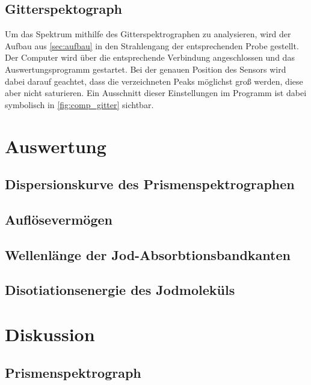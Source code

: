 \documentclass[12pt,english,ngerman]{scrartcl}
\begin{document}
\subsection{Gitterspektograph}

Um das Spektrum mithilfe des Gitterspektrographen zu analysieren, wird der Aufbau aus \autoref{sec:aufbau} in den Strahlengang
der entsprechenden Probe gestellt. Der Computer wird über die entsprechende Verbindung angeschlossen und das 
Auswertungsprogramm gestartet. Bei der genauen Position des Sensors wird dabei darauf geachtet, dass die verzeichneten
Peaks möglichst groß werden, diese aber nicht saturieren. Ein Ausschnitt dieser Einstellungen im Programm ist dabei symbolisch 
in \autoref{fig:comp_gitter} sichtbar.



\section{Auswertung}\label{sec:auswertung}


\subsection{Dispersionskurve des Prismenspektrographen}


\subsection{Auflösevermögen}


\subsection{Wellenlänge der Jod-Absorbtionsbandkanten}


\subsection{Disotiationsenergie des Jodmoleküls}


\section{Diskussion}\label{sec:disk}


\subsection{Prismenspektrograph}
\end{document}
